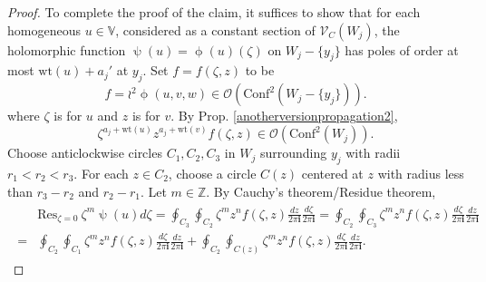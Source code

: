 \documentclass[11pt,b5paper,notitlepage]{article}
\theoremstyle{definition}
\theoremstyle{plain}
\newcommand{\Conf}{\mathrm{Conf}}
\newcommand{\Res}{\mathrm{Res}}
\newcommand{\SV}{\mathscr{V}}
\newcommand{\im}{\mathbf{i}}
\newcommand{\Vbb}{\mathbb V}
\newcommand{\Zbb}{\mathbb Z}
\newcommand{\wt}{\mathrm{wt}}
\newcommand{\<}{\left\langle}
\renewcommand{\>}{\right\rangle}
\newcommand{\MO}{\mathcal{O}}
\numberwithin{equation}{section}
\begin{document}
\begin{proof}
     


 
To complete the proof of the claim, it suffices to show that for each homogeneous $u\in \Vbb$, considered as a constant section of $\SV_C(W_j)$, the holomorphic function $\uppsi(u)=\upphi(u)(\zeta)$ on $W_j-\{y_j\}$ has poles of order at most $\wt(u)+a_j'$ at $y_j$. Set $f=f(\zeta,z)$ to be 
        $$
        f=\wr^2\upphi(u,v,w)\in \MO(\Conf^2(W_j-\{y_j\})).
        $$
where $\zeta$ is for $u$ and $z$ is for $v$.      By Prop. \ref{anotherversionpropagation2}, 
        \begin{equation}\label{proofpole}
            \zeta^{a_j+\wt(u)}z^{a_j+\wt(v)}f(\zeta,z)\in \MO(\Conf^2(W_j)).
        \end{equation}
Choose anticlockwise circles $C_1,C_2,C_3$ in $W_j$ surrounding $y_j$ with radii $r_1<r_2<r_3$. For each $z\in C_2$, choose a circle $C(z)$ centered at $z$ with radius less than $r_3-r_2$ and $r_2-r_1$. Let $m\in \Zbb$. By Cauchy's theorem/Residue theorem, 
        \begin{align}\label{proofpole2}
            \begin{aligned}
       & \Res_{\zeta=0}~\zeta^m\uppsi(u)d\zeta=\oint_{C_3}\oint_{C_2}\zeta^m z^n f(\zeta,z)\frac{dz}{2\pi\im} \frac{d\zeta}{2\pi\im}=\oint_{C_2}\oint_{C_3}\zeta^m z^n f(\zeta,z)\frac{d\zeta}{2\pi\im} \frac{dz}{2\pi\im} \\
        =&\oint_{C_2}\oint_{C_1}\zeta^m z^n f(\zeta,z)\frac{d\zeta}{2\pi\im} \frac{dz}{2\pi\im} +\oint_{C_2}\oint_{C(z)}\zeta^m z^n f(\zeta,z)\frac{d\zeta}{2\pi\im} \frac{dz}{2\pi\im}.
        \end{aligned}
        \end{align}


\end{proof}
\end{document}
